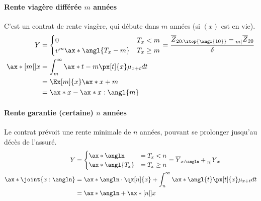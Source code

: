 \documentclass[10pt, french]{article}
\begin{document}
\begin{multicols*}{3}
\paragraph{Rente viagère différée $m$ années} C'est un contrat de rente viagère, qui débute dans $m$ années (si $(x)$ est en vie).
\begin{align*}
Y & = \begin{cases}
0											& T_x	 < 	 m	\\
v^m \ax*{\angl{T_x - m}}	& T_x 	\geq m	\\
\end{cases} = \frac{\overline{Z}_{20:\itop{\angl{10}}} - \prescript{}{m|}{\overline{Z}}_{20}}{\delta} \\ 
\ax*[m|]{x}	& = \int_{m}^{\infty} \ax*{t-m} \px[t]{x} \mu_{x+t} dt \\
	& = \Ex[m]{x} \ax*{x+m} \\
	& = \ax*{x} - \ax*{x:\angl{m}} \\
\end{align*}

\paragraph{Rente garantie (certaine) $n$ années} Le contrat prévoit une rente minimale de $n$ années, pouvant se prolonger jusqu'au décès de l'assuré.
\begin{align*}
Y & = \begin{cases}
\ax*{\angln}	& = T_x < n \\
\ax*{\angl{T_x}}	& = T_x \geq n \\
\end{cases} = \overline{Y}_{x:\angln} + \prescript{}{n|}{Y}_x \\
\ax*{\joint{x:\angln}}	& =\ax*{\angln} \cdot \qx[n]{x} + \int_{n}^{\infty} \ax*{\angl{t}} \px[t]{x} \mu_{x+t} dt \\
	& = \ax*{\angln} + \ax*[n|]{x} \\
\end{align*}



\end{multicols*}
\end{document}
